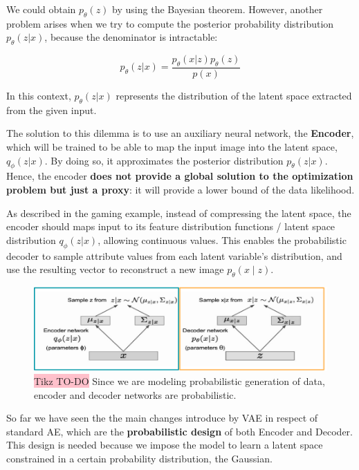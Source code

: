 We could obtain $p_{\theta}(z)$ by using the Bayesian theorem. However, another problem arises when we try to compute the posterior probability distribution $p_{\theta}(z|x)$, because the denominator is intractable:

$$p_{\theta}(z|x)= \frac{p_{\theta}(x|z)p_{\theta}(z)}{p(x)}$$

In this context, $p_{\theta}(z|x)$ represents the distribution of the latent space extracted from the given input.

The solution to this dilemma is to use an auxiliary neural network, the \textbf{Encoder}, which will be trained to be able to map the input image into the   latent space, $q_{\phi}(z|x)$. By doing so, it approximates the posterior distribution $p_{\theta}(z|x)$. Hence, the encoder \textbf{does not provide a global solution to the optimization problem but just a proxy}: it will provide a lower bound of the data likelihood.

As described in the gaming example, instead of compressing the latent space, the encoder should maps input to its feature distribution functions / latent space distribution $q_{\phi}(z \text{∣} x)$, allowing continuous values. This enables the probabilistic decoder to sample attribute values from each latent variable's distribution, and use the resulting vector to reconstruct a new image $p_{\theta}(x∣z)$. 

\begin{figure}[!htbp]
    \centering
    \includegraphics[width=1 \linewidth]{tikz/VAE encoder-decoder.png}
    \caption{{\color{red}\colorbox{pink}{Tikz TO-DO}} Since we are modeling probabilistic generation of data, encoder and decoder networks are probabilistic.}
    \label{fig:VAE-pro-structure}
\end{figure}


So far we have seen the the main changes introduce by VAE in respect of standard AE, which are the \textbf{probabilistic design} of both Encoder and Decoder. This design is needed because we impose the model to learn a latent space constrained in a certain probability distribution, the Gaussian.  


